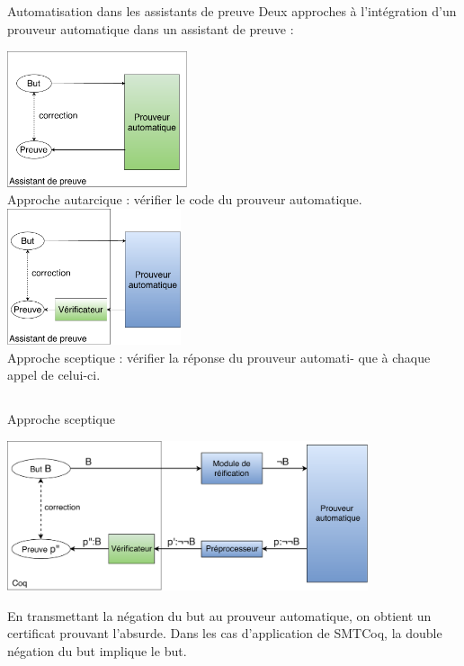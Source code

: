 \documentclass{beamer}
\begin{document}
\subsection{}
\begin{frame}{Automatisation dans les assistants de preuve}
Deux approches à l'intégration d'un prouveur automatique dans un assistant de preuve :
\begin{multicols}{2}
\includegraphics[height=4cm]{1_Autarcique.pdf}\\
Approche autarcique : vérifier le code du prouveur automatique.
\includegraphics[height=4cm]{2_Sceptique.pdf}\\
Approche sceptique : vérifier la réponse du prouveur automati- que à chaque appel de celui-ci.
\end{multicols}
\end{frame}


\subsection{}
\begin{frame}{Approche sceptique}

\begin{center}
\includegraphics[height=4.4cm]{smtcoq_auto.pdf}
\end{center}

En transmettant la négation du but au prouveur automatique, on obtient un certificat prouvant l'absurde. Dans les cas d'application de SMTCoq, la double négation du but implique le but.


\end{frame}
\end{document}
